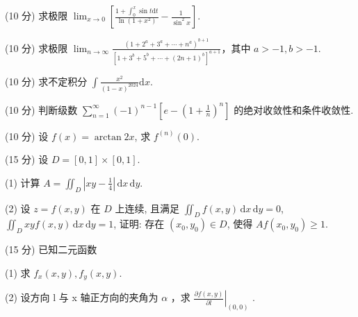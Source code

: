 (10 分) 求极限 $\lim_{x\to 0}\left[\frac{1 + \int_0^x\sin t\mathrm{d}t}{\ln(1 + x^2)} -\frac{1}{\sin^2x}\right].$\par
(10 分) 求极限 $\lim_{n\to \infty}\frac{(1 + 2^a + 3^a + \cdots + n^a)^{b + 1}}{[1 + 3^b + 5^b + \cdots + (2n + 1)^b]^{a + 1}}$，其中 $a > -1, b > -1$.\par
(10 分) 求不定积分 $\int \frac{x^2}{(1 - x)^{2024}} \mathrm{d}x$.\par
(10 分) 判断级数 $\sum_{n=1}^{\infty} (-1)^{n-1} \left[ e - \left( 1 + \frac{1}{n} \right)^n \right]$ 的绝对收敛性和条件收敛性.\par
(10 分) 设 $f(x) = \arctan 2x$, 求 $f^{(n)}(0)$.\par
(15 分) 设 $D = [0, 1] \times [0, 1]$.\par
(1) 计算 $A = \iint_{D} \left| xy - \frac{1}{4} \right| \, \mathrm{d}x \, \mathrm{d}y$.\par
(2) 设 $z = f(x, y)$ 在 $D$ 上连续, 且满足 $\iint_{D} f(x, y) \, \mathrm{d}x \, \mathrm{d}y = 0$, $\iint_{D} xyf(x, y) \, \mathrm{d}x \, \mathrm{d}y = 1$, 证明: 存在 $(x_0, y_0) \in D$, 使得 $Af(x_0, y_0) \geq 1$.\par
\par{}
(15 分) 已知二元函数\par
\nopagebreak[4]
(1) 求 $f_{x}(x, y), f_{y}(x, y)$.\par
(2) 设方向 l 与 x 轴正方向的夹角为  $\alpha$ ，求  $\left.\frac{\partial f(x,y)}{\partial l}\right|_{(0,0)}$ .\par
